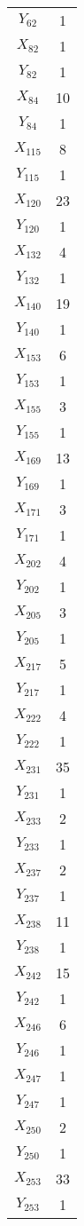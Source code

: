 \documentclass[a4paper,10pt]{article}
\begin{document}
\begin{center}
\begin{longtable}{cc}
$Y_{62}$ & 1 \\
$X_{82}$ & 1 \\
$Y_{82}$ & 1 \\
$X_{84}$ & 10 \\
$Y_{84}$ & 1 \\
$X_{115}$ & 8 \\
$Y_{115}$ & 1 \\
$X_{120}$ & 23 \\
$Y_{120}$ & 1 \\
$X_{132}$ & 4 \\
$Y_{132}$ & 1 \\
$X_{140}$ & 19 \\
$Y_{140}$ & 1 \\
$X_{153}$ & 6 \\
$Y_{153}$ & 1 \\
$X_{155}$ & 3 \\
$Y_{155}$ & 1 \\
$X_{169}$ & 13 \\
$Y_{169}$ & 1 \\
$X_{171}$ & 3 \\
$Y_{171}$ & 1 \\
$X_{202}$ & 4 \\
$Y_{202}$ & 1 \\
$X_{205}$ & 3 \\
$Y_{205}$ & 1 \\
$X_{217}$ & 5 \\
$Y_{217}$ & 1 \\
$X_{222}$ & 4 \\
$Y_{222}$ & 1 \\
$X_{231}$ & 35 \\
$Y_{231}$ & 1 \\
$X_{233}$ & 2 \\
$Y_{233}$ & 1 \\
$X_{237}$ & 2 \\
$Y_{237}$ & 1 \\
$X_{238}$ & 11 \\
$Y_{238}$ & 1 \\
$X_{242}$ & 15 \\
$Y_{242}$ & 1 \\
$X_{246}$ & 6 \\
$Y_{246}$ & 1 \\
$X_{247}$ & 1 \\
$Y_{247}$ & 1 \\
$X_{250}$ & 2 \\
$Y_{250}$ & 1 \\
$X_{253}$ & 33 \\
$Y_{253}$ & 1 \\
\end{longtable}
\end{center}
\end{document}
